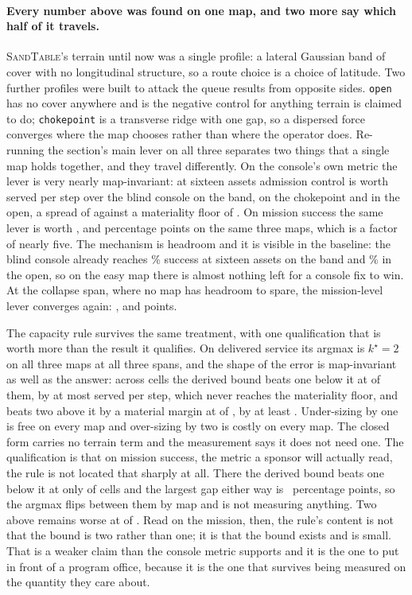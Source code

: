 \documentclass[11pt]{article}
\newcommand{\sandtable}{\textsc{SandTable}}
\begin{document}
\paragraph{Every number above was found on one map, and two more say which half of it travels.}
\sandtable{}'s terrain until now was a single profile: a lateral Gaussian band of cover with no
longitudinal structure, so a route choice is a choice of latitude. Two further profiles were built to
attack the queue results from opposite sides. \texttt{open} has no cover anywhere and is the negative
control for anything terrain is claimed to do; \texttt{chokepoint} is a transverse ridge with one gap,
so a dispersed force converges where the map chooses rather than where the operator does. Re-running
the section's main lever on all three separates two things that a single map holds together, and they
travel differently. On the console's own metric the lever is very nearly map-invariant: at sixteen
assets admission control is worth \MpBandSrvFull{} served per step over the blind console on the
band, \MpChokeSrvFull{} on the chokepoint and \MpOpenSrvFull{} in the open, a spread of
\MpSrvSpread{} against a materiality floor of \MpMPE{}. On mission success the same lever is worth
\MpBandSucFull{}, \MpChokeSucFull{} and \MpOpenSucFull{} percentage points on the same three maps,
which is a factor of nearly five. The mechanism is headroom and it is visible in the baseline: the
blind console already reaches \MpBandBlindFull\% success at sixteen assets on the band and
\MpOpenBlindFull\% in the open, so on the easy map there is almost nothing left for a console fix to
win. At the collapse span, where no map has headroom to spare, the mission-level lever converges
again: \MpBandSucColl{}, \MpChokeSucColl{} and \MpOpenSucColl{} points.

The capacity rule survives the same treatment, with one qualification that is worth more than the
result it qualifies. On delivered service its argmax is $k^{\star} = 2$ on all three maps at all
three spans, and the shape of the error is map-invariant as well as the answer:
across \MpCapCells{} cells the derived bound beats one below it at \MpCapLoWin{} of them, by at most
\MpCapUnderWorst{} served per step, which never reaches the materiality floor, and beats two above it
by a material margin at \MpCapHiWin{} of \MpCapCells{}, by at least \MpCapOverWorst{}. Under-sizing by
one is free on every map and over-sizing by two is costly on every map. The closed form carries no
terrain term and the measurement says it does not need one. The qualification is that on mission
success, the metric a sponsor will actually read, the rule is not located that sharply at all. There
the derived bound beats one below it at only \MpSucCapLoWin{} of \MpCapCells{} cells and the largest
gap either way is \MpSucCapLoGap{}~percentage points, so the argmax flips between them by map and is
not measuring anything. Two above remains worse at \MpSucCapHiWin{} of \MpCapCells{}. Read on the
mission, then, the rule's content is not that the bound is two rather than one; it is that the bound
exists and is small. That is a weaker claim than the console metric supports and it is the one to
put in front of a program office, because it is the one that survives being measured on the quantity
they care about.
\end{document}
